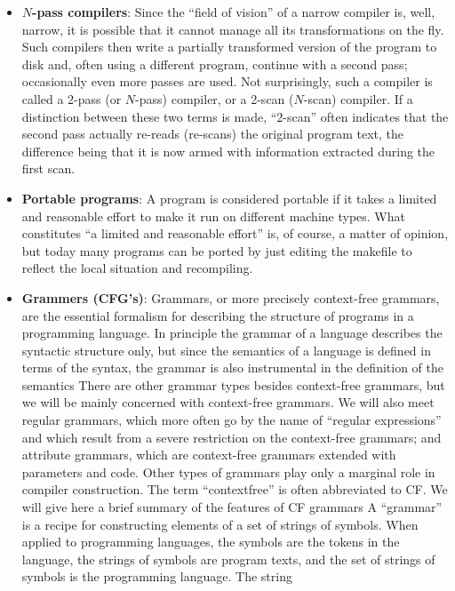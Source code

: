 \documentclass{report}
\begin{document}
\begin{itemize}
            \bigbreak \noindent 
            A broad compiler reads the entire program and applies a series of transformations to it (lexical, syntactic, contextual, optimizing, code generating, etc.), which eventually result in the desired object code. This object code is then generally written to a file
        \item \textbf{$N$-pass compilers}: 
            Since the “field of vision” of a narrow compiler is, well, narrow, it is possible that it cannot manage all its transformations on the fly. Such compilers then write a partially transformed version of the program to disk and, often using a different program, continue with a second pass; occasionally even more passes are used. Not surprisingly, such a compiler is called a 2-pass (or $N$-pass) compiler, or a 2-scan ($N$-scan) compiler. If a distinction between these two terms is made, “2-scan” often indicates that the second pass actually re-reads (re-scans) the original program text, the difference being that it is now armed with information extracted during the first scan.
        \item \textbf{Portable programs}: A program is considered portable if it takes a limited and reasonable effort to make it run on different machine types. What constitutes “a limited and reasonable effort” is, of course, a matter of opinion, but today many programs can be ported by just editing the makefile to reflect the local situation and recompiling.
        \item \textbf{Grammers (CFG's)}: Grammars, or more precisely context-free grammars, are the essential formalism for describing the structure of programs in a programming language. In principle the grammar of a language describes the syntactic structure only, but since the semantics of a language is defined in terms of the syntax, the grammar is also instrumental in the definition of the semantics
            \bigbreak \noindent 
            There are other grammar types besides context-free grammars, but we will be mainly concerned with context-free grammars. We will also meet regular grammars, which more often go by the name of “regular expressions” and which result from a severe restriction on the context-free grammars; and attribute grammars, which are context-free grammars extended with parameters and code. Other types of grammars play only a marginal role in compiler construction. The term “contextfree” is often abbreviated to CF. We will give here a brief summary of the features of CF grammars
            \bigbreak \noindent 
            A “grammar” is a recipe for constructing elements of a set of strings of symbols. When applied to programming languages, the symbols are the tokens in the language, the strings of symbols are program texts, and the set of strings of symbols is the programming language. The string

\end{itemize}
\end{document}
